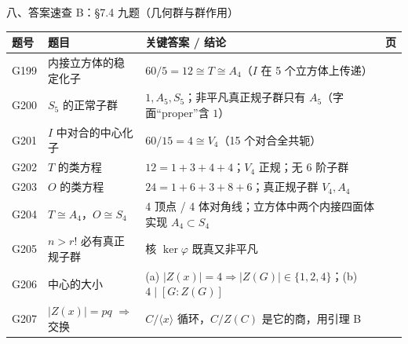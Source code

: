 \documentclass[aspectratio=169,10pt,fontset=none]{ctexbeamer}
\begin{document}
\begin{frame}[t]{八、答案速查 B：\S7.4 九题（几何群与群作用）}
  \centering
  \scriptsize
  \setlength{\tabcolsep}{3pt}
  \renewcommand{\arraystretch}{1.22}
  \begin{tabular}{@{}l l l c@{}}
    \toprule
    题号 & 题目 & 关键答案 / 结论 & 页\\
    \midrule
    G199 & 内接立方体的稳定化子 & $60/5=12\cong T\cong A_4$（$I$ 在 5 个立方体上传递） & \pageref{ex:G199}\\
    G200 & $S_5$ 的正常子群 & $1,A_5,S_5$；非平凡真正规子群只有 $A_5$（字面“proper”含 $1$） & \pageref{ex:G200}\\
    G201 & $I$ 中对合的中心化子 & $60/15=4\cong V_4$（15 个对合全共轭） & \pageref{ex:G201}\\
    G202 & $T$ 的类方程 & $12=1+3+4+4$；$V_4$ 正规；无 6 阶子群 & \pageref{ex:G202}\\
    G203 & $O$ 的类方程 & $24=1+6+3+8+6$；真正规子群 $V_4,A_4$ & \pageref{ex:G203}\\
    G204 & $T\cong A_4$，$O\cong S_4$ & 4 顶点 / 4 体对角线；立方体中两个内接四面体实现 $A_4\subset S_4$ & \pageref{ex:G204}\\
    G205 & $n>r!$ 必有真正规子群 & 核 $\ker\varphi$ 既真又非平凡 & \pageref{ex:G205}\\
    G206 & 中心的大小 & (a) $|Z(x)|=4\Rightarrow|Z(G)|\in\{1,2,4\}$；(b) $4\mid[G:Z(G)]$ & \pageref{ex:G206}\\
    G207 & $|Z(x)|=pq$ $\Rightarrow$ 交换 & $C/\langle x\rangle$ 循环，$C/Z(C)$ 是它的商，用引理 B & \pageref{ex:G207}\\
    \bottomrule
  \end{tabular}
\end{frame}
\end{document}
